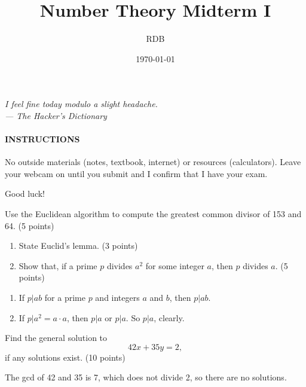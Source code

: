 \documentclass[12pt]{rudin}
\title{Number Theory Midterm I}
\author{RDB}
\date{\today}
\begin{document}
\maketitle

\begin{centering}
    \emph{I feel fine today modulo a slight headache. \\ \hfill --- The
    Hacker's Dictionary}
\end{centering}

\paragraph{INSTRUCTIONS} No outside materials (notes, textbook, internet) or
resources (calculators). Leave your webcam on until you submit and I confirm
that I have your exam.

Good luck!

\begin{Exercise}
    Use the Euclidean algorithm to compute the greatest common divisor of 153
    and 64. (5 points)
\end{Exercise}

\begin{Exercise}
    \begin{enumerate}[label=(\textbf{\alph*})]
        \item State Euclid's lemma. (3 points)
        \item Show that, if a prime $p$ divides $a^2$ for some integer $a$,
            then $p$ divides $a$. (5 points)
    \end{enumerate}
\end{Exercise}

\begin{Answer}
    \begin{enumerate}[label=(\textbf{\alph*})]
        \item If $p | ab$ for a prime $p$ and integers $a$ and $b$, then $p |
            ab$.
        \item If $p | a^2 = a \cdot a$, then $p | a$ or $p | a$. So $p | a$,
            clearly.
    \end{enumerate}
\end{Answer}

\begin{Exercise}
    Find the general solution to
    \[
        42x + 35y = 2,
    \]
    if any solutions exist. (10 points)
\end{Exercise}

\begin{Answer}
    The gcd of 42 and 35 is 7, which does not divide 2, so there are no
    solutions.
\end{Answer}
\end{document}
